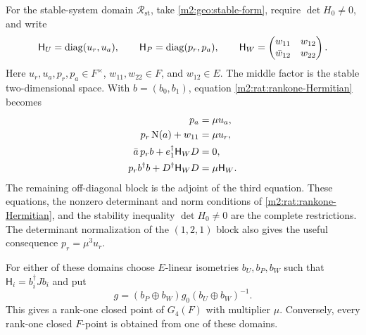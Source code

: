 For the stable-system domain $\mathscr R_{\mathrm{st}}$,
take \eqref{m2:geo:stable-form}, require $\det H_0\ne0$,
and write
\begin{equation}\label{m2:rat:stable-forms}
 \mathsf H_U=\operatorname{diag}(u_r,u_a),\qquad \mathsf H_P=\operatorname{diag}(p_r,p_a),
 \qquad
 \mathsf H_W=\begin{pmatrix}w_{11}&w_{12}\\
                    \bar w_{12}&w_{22}\end{pmatrix}.
\end{equation}
Here $u_r,u_a,p_r,p_a\in F^\times$,
$w_{11},w_{22}\in F$, and $w_{12}\in E$.  The middle
factor is the stable two-dimensional space.  With
$b=(b_0,b_1)$, equation \eqref{m2:rat:rankone-Hermitian}
becomes
\begin{align}
 p_a&=\mu u_a,\label{m2:rat:stable-domain}\\
 p_r\operatorname{N}(a)+w_{11}&=\mu u_r,\notag\\
 \bar a\,p_rb+e_1^\dagger \mathsf H_WD&=0,\notag\\
 p_rb^\dagger b+D^\dagger \mathsf H_WD&=\mu \mathsf H_W.\notag
\end{align}
The remaining off-diagonal block is the adjoint of the
third equation.  These equations, the nonzero determinant
and norm conditions of \eqref{m2:rat:rankone-Hermitian},
and the stability inequality $\det H_0\ne0$ are the
complete restrictions.  The determinant normalization
of the $(1,2,1)$ block also gives the useful consequence
$p_r=\mu^3u_r$.

\begin{proposition}\label{m2:rat:rankone-param}
For either of these domains choose $E$-linear isometries
$b_U,b_P,b_W$ such that $\mathsf H_i=b_i^\dagger Jb_i$ and put
\begin{equation}\label{m2:rat:rankone-transport-forms}
 g=(b_P\oplus b_W)g_0(b_U\oplus b_W)^{-1}.
\end{equation}
This gives a rank-one closed point of $G_4(F)$ with
multiplier $\mu$.  Conversely, every rank-one closed
$F$-point is obtained from one of these domains.
\end{proposition}

